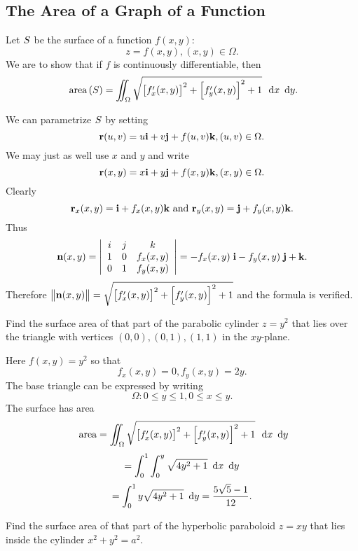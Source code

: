  \subsection{The Area of a Graph of a Function}

Let $S$ be the surface of a function $f(x,y):$%
\[
z=f(x,y),(x,y)\in \Omega .
\]
We are to show that if $f$ is continuously differentiable, then
\[
\area{\superficie}=\diint_\Omega \sqrt{\left[ f_x^{\prime }(x,y)\right] ^2+%
\left[ f_y^{\prime }(x,y)\right] ^2+1}\,\dx\dy.
\]

We can parametrize $S$ by setting
\[
\mathbf{ r}(u,v)=u\mathbf{ i}+v\mathbf{ j}+f(u,v)\mathbf{ k},(u,v)\in \Omega .
\]
We may just as well use $x$ and $y$ and write
\[
\mathbf{ r}(x,y)=x\mathbf{ i}+y\mathbf{ j}+f(x,y)\mathbf{ k},(x,y)\in \Omega .
\]
Clearly
\[
\mathbf{ r}_x(x,y)=\mathbf{ i}+f_x(x,y)\mathbf{ k}\text{ and }\mathbf{ r}_y(x,y)=\mathbf{ j}+f_y(x,y)\mathbf{ k}.
\]
Thus
\[
 \mathbf{ n}(x,y)=\left|
\begin{array}{ccc}
i & j & k \\
1 & 0 & f_x(x,y) \\
0 & 1 & f_y(x,y)
\end{array}
\right| =-f_x(x,y)\;\mathbf{ i}-f_y(x,y)\;\mathbf{ j}+\mathbf{ k}.
\]
Therefore $\left\|  \vector{n}(x,y)\right\| =\sqrt{\left[ f_x^{\prime }(x,y)\right] ^2+%
\left[ f_y^{\prime }(x,y)\right] ^2+1}$ and the formula is verified.

\begin{exa}
  Find the surface area of that part of the parabolic
cylinder $z=y^2$ that lies over the triangle with vertices $%
(0,0),(0,1),(1,1) $ in the $xy$-plane.
\end{exa}


\begin{solu}

Here $f(x,y)=y^2$ so that
\[
f_x(x,y)=0,f_y(x,y)=2y.
\]
The base triangle can be expressed by writing
\[
\Omega :0\le y\le 1,0\le x\le y.
\]
The surface has area
\[
\area =\diint_\Omega \sqrt{\left[ f_x^{\prime }(x,y)\right] ^2+\left[ f_y^{\prime
}(x,y)\right] ^2+1}\,\dx\dy
\]
\[
=\dint_0^1\dint_0^y\sqrt{4y^2+1}\dx\dy
\]
\[
=\dint_0^1y\sqrt{4y^2+1}\dy=\dfrac{5\sqrt{5}-1}{12}.
\]
\end{solu}

\begin{exa}
 Find the surface area of that part of the hyperbolic
paraboloid $z=xy$ that lies inside the cylinder $x^2+y^2=a^2.$
\end{exa}


